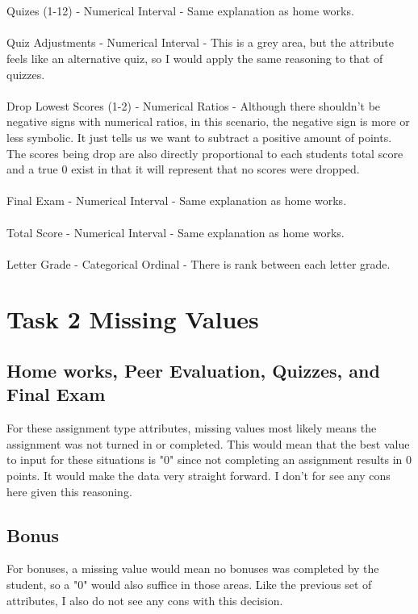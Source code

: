 \documentclass{article}
\begin{document}
\\\\Quizes (1-12) - Numerical Interval - Same explanation as home works.
\\\\Quiz Adjustments - Numerical Interval - This is a grey area, but the attribute feels like an alternative quiz, so I would apply the same reasoning to that of quizzes.
\\\\Drop Lowest Scores (1-2)  - Numerical Ratios - Although there shouldn't be negative signs with numerical ratios, in this scenario, the negative sign is more or less symbolic. It just tells us we want to subtract a positive amount of points. The scores being drop are also directly proportional to each students total score and a true 0 exist in that it will represent that no scores were dropped.
\\\\Final Exam  - Numerical Interval - Same explanation as home works.
\\\\Total Score  - Numerical Interval - Same explanation as home works.
\\\\Letter Grade - Categorical Ordinal - There is rank between each letter grade.

\section{Task 2 Missing Values}
\subsection{Home works, Peer Evaluation, Quizzes, and Final Exam} 
For these assignment type attributes, missing values most likely means the assignment was not turned in or completed. This would mean that the best value to input for these situations is "0" since not completing an assignment results in 0 points. It would make the data very straight forward. I don't for see any cons here given this reasoning.
\subsection{Bonus}
For bonuses, a missing value would mean no bonuses was completed by the student, so a "0" would also suffice in those areas. Like the previous set of attributes, I also do not see any cons with this decision. 
\end{document}
